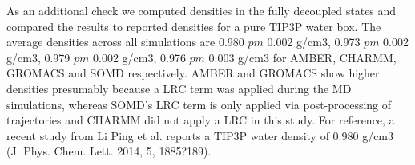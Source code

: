 \documentclass[journal=jctcce,manuscript=article]{achemso}
\begin{document}
As an additional check we computed densities in the fully decoupled states and compared the results to reported densities for a pure TIP3P water box. The average densities across all simulations are 0.980 $pm$ 0.002 g/cm3,  0.973 $pm$ 0.002 g/cm3, 0.979 $pm$ 0.002 g/cm3, 0.976 $pm$ 0.003 g/cm3 for AMBER, CHARMM, GROMACS and SOMD respectively. AMBER and GROMACS show higher densities presumably because a LRC term was applied during the MD simulations, whereas SOMD's LRC term is only applied via post-processing of trajectories and CHARMM did not apply a LRC in this study. For reference, a recent study from Li Ping et al. reports a TIP3P water density of 0.980 g/cm3 (J. Phys. Chem. Lett. 2014, 5, 1885?189). 

\end{document}
